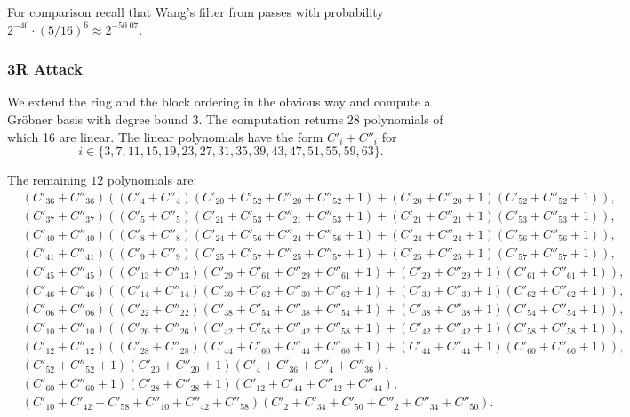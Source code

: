 For comparison recall that Wang's filter from \cite{present-dc:africacrypt} passes with probability $2^{-40} \cdot (5/16)^6 \approx 2^{-50.07}$.

\subsubsection*{3R Attack}
We extend the ring and the block ordering in the obvious way and compute a Gröbner basis with degree bound 3. The computation returns 28 polynomials of which 16 are linear. The linear polynomials have the form $C'_{i} + C''_{i}$ for $$i \in
\{3,7,11,15,19,23,27,31,35,39,43,47,51,55,59,63\}.$$

The remaining $12$ polynomials are:
\begin{eqnarray*}
&(C'_{36} + C''_{36})((C'_{ 4} + C''_{4})(C'_{20} + C'_{52} + C''_{20} + C''_{52} + 1) +  (C'_{20}+C''_{20}+1)(C'_{52} + C''_{52}+1)),\\
&(C'_{37} + C''_{37})((C'_{ 5} + C''_{ 5})(C'_{21} + C'_{53} + C''_{21} + C''_{53} + 1) + (C'_{21} + C''_{21} + 1)(C'_{53} + C''_{53} + 1)),\\
&(C'_{40} + C''_{40})((C'_{ 8} + C''_{ 8})(C'_{24} + C'_{56} + C''_{24} + C''_{56} +1) + (C'_{24} + C''_{24} + 1)(C'_{56} + C''_{56} + 1)),\\
&(C'_{41} + C''_{41})((C'_{ 9} + C''_{ 9})(C'_{25} + C'_{57} + C''_{25} + C''_{57} +1) + (C'_{25} + C''_{25} + 1)(C'_{57} + C''_{57} + 1)),\\
&(C'_{45} + C''_{45})((C'_{13} + C''_{13})(C'_{29} + C'_{61} + C''_{29} + C''_{61} + 1) + (C'_{29} + C''_{29} + 1)(C'_{61} + C''_{61} + 1)),\\
&(C'_{46} + C''_{46})((C'_{14} + C''_{14})(C'_{30} + C'_{62} + C''_{30} + C''_{62} + 1) + (C'_{30} + C''_{30} + 1)(C'_{62} + C''_{62} + 1)),\\
& (C'_{06} + C''_{06})((C'_{22} + C''_{22})(C'_{38} + C'_{54} + C''_{38} + C''_{54} + 1) + (C'_{38} + C''_{38} + 1)(C'_{54} + C''_{54} + 1)),\\
& (C'_{10} + C''_{10})((C'_{26} + C''_{26})(C'_{42} + C'_{58} + C''_{42} + C''_{58} + 1) + (C'_{42} + C''_{42} + 1)(C'_{58} + C''_{58} + 1)),\\
& (C'_{12} + C''_{12})((C'_{28} + C''_{28})(C'_{44} + C'_{60} + C''_{44} + C''_{60} + 1) + (C'_{44} + C''_{44} + 1)(C'_{60} + C''_{60} + 1)),\\
& (C'_{52} + C''_{52} + 1)(C'_{20} + C''_{20} + 1)(C'_{ 4} + C'_{36} + C''_{ 4} + C''_{36}),\\
& (C'_{60} + C''_{60} + 1)(C'_{28} + C''_{28} + 1)(C'_{12} + C'_{44} + C''_{12} + C''_{44}),\\
& (C'_{10} + C'_{42} + C'_{58} + C''_{10} + C''_{42} + C''_{58})(C'_{ 2} + C'_{34} + C'_{50} + C''_{ 2} + C''_{34} + C''_{50}).\\
\end{eqnarray*}


